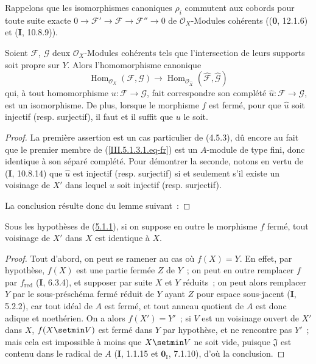 Rappelons que les isomorphismes canoniques $\rho_i$ commutent aux cobords pour
toute suite exacte
$0\to\mathcal F'\to\mathcal F\to\mathcal F''\to0$ de $\mathcal O_X$-Modules
cohérents ((\textbf{0}, 12.1.6) et (\textbf{I}, 10.8.9)).

\begin{corollary}[5.1.3]
\label{III.5.1.3-fr}
Soient $\mathcal F$, $\mathcal G$ deux $\mathcal O_X$-Modules cohérents tels que
l'intersection de leurs supports soit propre sur $Y$. Alors l'homomorphisme canonique
\begin{equation}
\operatorname{Hom}_{\mathcal O_X}(\mathcal F,\mathcal G)
\longrightarrow
\operatorname{Hom}_{\mathcal O_{\widehat X}}
(\widehat{\mathcal F},\widehat{\mathcal G})
\tag{5.1.3.1}
\label{III.5.1.3.1.eq-fr}
\end{equation}
qui, à tout homomorphisme $u:\mathcal F\to\mathcal G$, fait correspondre son
complété $\widehat u:\mathcal F\to\mathcal G$, est un
isomorphisme. De plus, lorsque le morphisme $f$ est fermé, pour que $\widehat u$ soit
injectif (\textup{resp.} surjectif), il faut et il suffit que $u$ le soit.
\end{corollary}

\begin{proof}
La première assertion est un cas particulier de (4.5.3), dû encore au fait que le
premier membre de (\ref{III.5.1.3.1.eq-fr}) est un $A$-module de type fini, donc
identique à son séparé complété. Pour démontrer la seconde, notons en vertu de
(\textbf{I}, 10.8.14) que $\widehat u$ est injectif (resp. surjectif) si et seulement s'il existe
un voisinage de $X'$ dans lequel $u$ soit injectif (resp. surjectif).

La conclusion
résulte donc du lemme suivant~:
\end{proof}

\begin{lemma}[5.1.3.1]
\label{III.5.1.3.1-fr}
Sous les hypothèses de \textup{(\hyperref[III.5.1.1-fr]{5.1.1})}, si on suppose en outre le
morphisme $f$ fermé, tout voisinage de $X'$ dans $X$ est identique à $X$.
\end{lemma}

\begin{proof}
Tout d'abord, on peut se ramener au cas où $f(X)=Y$. En effet, par hypothèse,
$f(X)$ est une partie fermée $Z$ de $Y$~; on peut en outre remplacer $f$ par
$f_{\mathrm{red}}$ (\textbf{I}, 6.3.4), et supposer par suite $X$ et $Y$ réduits~; on peut alors
remplacer $Y$ par le sous-préschéma fermé réduit de $Y$ ayant $Z$ pour espace
sous-jacent (\textbf{I}, 5.2.2), car tout idéal de $A$ est fermé, et tout anneau quotient de
$A$ est donc adique et noethérien. On a alors $f(X')=Y'$~; si $V$ est un voisinage
ouvert de $X'$ dans $X$, $f(X\setmin V)$ est fermé dans $Y$ par hypothèse, et ne rencontre
pas $Y'$~; mais cela est impossible à moins que $X\setmin V$ ne soit vide, puisque
$\mathfrak J$ est contenu dans le radical de $A$ (\textbf{I}, 1.1.15 et $\mathbf{0}_{\mathrm I}$,
7.1.10), d'où la conclusion.
\end{proof}

